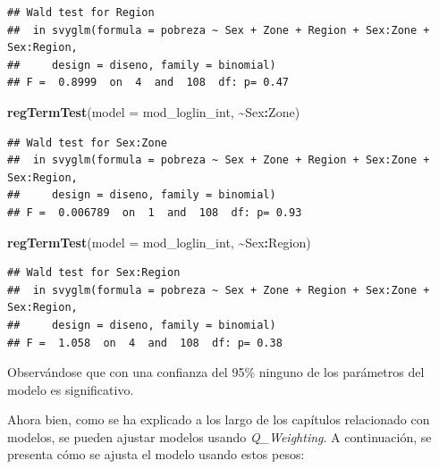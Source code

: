 \documentclass[
  12pt,
]{book}
\newenvironment{Shaded}{\begin{snugshade}}{\end{snugshade}}
\newcommand{\AttributeTok}[1]{\textcolor[rgb]{0.13,0.29,0.53}{#1}}
\newcommand{\FunctionTok}[1]{\textcolor[rgb]{0.13,0.29,0.53}{\textbf{#1}}}
\newcommand{\NormalTok}[1]{#1}
\newcommand{\SpecialCharTok}[1]{\textcolor[rgb]{0.81,0.36,0.00}{\textbf{#1}}}
\begin{document}
\begin{verbatim}
## Wald test for Region
##  in svyglm(formula = pobreza ~ Sex + Zone + Region + Sex:Zone + Sex:Region, 
##     design = diseno, family = binomial)
## F =  0.8999  on  4  and  108  df: p= 0.47
\end{verbatim}

\begin{Shaded}
\begin{Highlighting}[]
  \FunctionTok{regTermTest}\NormalTok{(}\AttributeTok{model =}\NormalTok{ mod\_loglin\_int, }\SpecialCharTok{\textasciitilde{}}\NormalTok{Sex}\SpecialCharTok{:}\NormalTok{Zone)}
\end{Highlighting}
\end{Shaded}

\begin{verbatim}
## Wald test for Sex:Zone
##  in svyglm(formula = pobreza ~ Sex + Zone + Region + Sex:Zone + Sex:Region, 
##     design = diseno, family = binomial)
## F =  0.006789  on  1  and  108  df: p= 0.93
\end{verbatim}

\begin{Shaded}
\begin{Highlighting}[]
  \FunctionTok{regTermTest}\NormalTok{(}\AttributeTok{model =}\NormalTok{ mod\_loglin\_int, }\SpecialCharTok{\textasciitilde{}}\NormalTok{Sex}\SpecialCharTok{:}\NormalTok{Region)}
\end{Highlighting}
\end{Shaded}

\begin{verbatim}
## Wald test for Sex:Region
##  in svyglm(formula = pobreza ~ Sex + Zone + Region + Sex:Zone + Sex:Region, 
##     design = diseno, family = binomial)
## F =  1.058  on  4  and  108  df: p= 0.38
\end{verbatim}

Observándose que con una confianza del 95\% ninguno de los parámetros del modelo es significativo.

Ahora bien, como se ha explicado a los largo de los capítulos relacionado con modelos, se pueden ajustar modelos usando \emph{Q\_Weighting}. A continuación, se presenta cómo se ajusta el modelo usando estos pesos:
\end{document}
